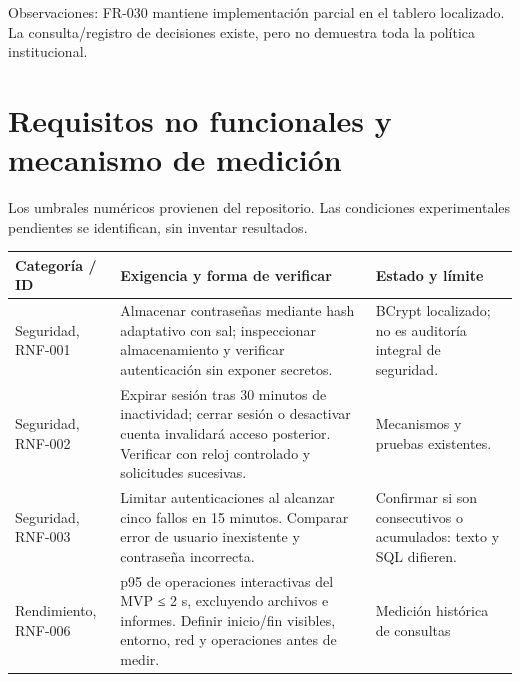 \documentclass[12pt,a4paper]{report}
\begin{document}
Observaciones: FR-030 mantiene implementación parcial en el tablero
localizado. La consulta/registro de decisiones existe, pero no demuestra
toda la política institucional.

\section{Requisitos no funcionales y mecanismo de
medición}\label{requisitos-no-funcionales-y-mecanismo-de-mediciuxf3n}

Los umbrales numéricos provienen del repositorio. Las condiciones
experimentales pendientes se identifican, sin inventar resultados.

{\def\LTcaptype{none} %
\begin{longtable}[]{@{}
  >{\raggedright\arraybackslash}p{}
  >{\raggedright\arraybackslash}p{}
  >{\raggedright\arraybackslash}p{}@{}}
\toprule\noalign{}
\begin{minipage}[b]{\linewidth}\raggedright
Categoría / ID
\end{minipage} & \begin{minipage}[b]{\linewidth}\raggedright
Exigencia y forma de verificar
\end{minipage} & \begin{minipage}[b]{\linewidth}\raggedright
Estado y límite
\end{minipage} \\
\midrule\noalign{}
\endhead
\bottomrule\noalign{}
\endlastfoot
Seguridad, RNF-001 & Almacenar contraseñas mediante hash adaptativo con
sal; inspeccionar almacenamiento y verificar autenticación sin exponer
secretos. & BCrypt localizado; no es auditoría integral de seguridad. \\
Seguridad, RNF-002 & Expirar sesión tras 30 minutos de inactividad;
cerrar sesión o desactivar cuenta invalidará acceso posterior. Verificar
con reloj controlado y solicitudes sucesivas. & Mecanismos y pruebas
existentes. \\
Seguridad, RNF-003 & Limitar autenticaciones al alcanzar cinco fallos en
15 minutos. Comparar error de usuario inexistente y contraseña
incorrecta. & Confirmar si son consecutivos o acumulados: texto y SQL
difieren. \\
Rendimiento, RNF-006 & p95 de operaciones interactivas del MVP ≤ 2 s,
excluyendo archivos e informes. Definir inicio/fin visibles, entorno,
red y operaciones antes de medir. & Medición histórica de consultas

\end{longtable}}
\end{document}

